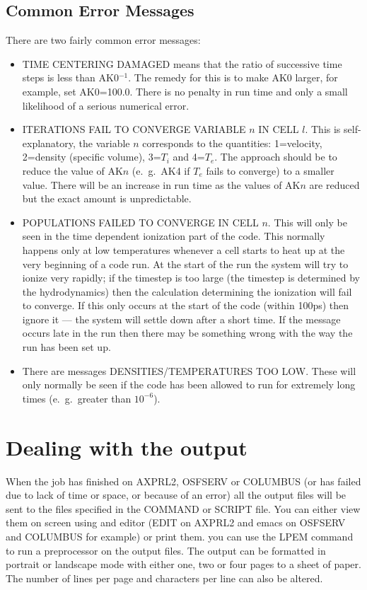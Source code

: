 \subsection{Common Error Messages}
There are two fairly common error messages:
\begin{itemize}
\item TIME CENTERING DAMAGED means that the ratio of successive time
steps is less than AK0$^{-1}$. The remedy for this is to make AK0 larger,
for example, set AK0=100.0. There is no penalty in run time and only a
small likelihood of a serious numerical error.
\item ITERATIONS FAIL TO CONVERGE VARIABLE $n$ IN CELL $l$. This is
self-explanatory, the variable $n$ corresponds to the quantities:
1=velocity, 2=density (specific volume), 3=$T_i$ and 4=$T_e$. The
approach should be to reduce the value of AK$n$ (e.\ g.\ AK4 if $T_e$
fails to converge) to a smaller value. There will be an increase in
run time as the values of AK$n$ are reduced but the exact amount
is unpredictable.
\item POPULATIONS FAILED TO CONVERGE IN CELL $n$. This will only
be seen in the time dependent ionization part of the code. This normally
happens only at low temperatures whenever 
a cell starts to heat up at the very beginning of a code run. At the start of
the run the system will try to ionize very rapidly; if the timestep
is too large (the timestep is determined by the
hydrodynamics) then the
calculation determining the ionization will fail to converge. If this
only occurs at the start of the code (within 100ps)
then ignore it --- the system will
settle down after a short time. If the message occurs late in the
run then there may be something wrong with the way the run has been
set up.
\item There are messages DENSITIES/TEMPERATURES TOO LOW. These
will only normally be seen if the code has been allowed to run for
extremely long times (e.\ g.\ greater than $10^{-6}$).
\end{itemize}

\newpage
\section{Dealing with the output}
When the job has finished on AXPRL2, OSFSERV or COLUMBUS
(or has failed due to lack of time or space,
or because of an error) all the output files will be sent to
the files specified in the COMMAND or SCRIPT file.
You can either view them on screen using and editor (EDIT on AXPRL2 and
emacs on OSFSERV and COLUMBUS for example) or
print them. you can use the  LPEM command to run a
preprocessor on the output files.
The output can be formatted in portrait or landscape
mode with either one, two or four pages to a sheet of paper. The number
of lines  per page and characters per line can also be altered.

